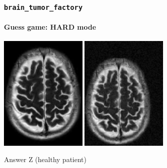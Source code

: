 \documentclass[]{beamer}
\newcommand{\btf}{\tt{brain\_tumor\_factory}}
\begin{document}
\begin{frame}
  \frametitle{\btf}
  \framesubtitle{Guess game: HARD mode}
  \begin{minipage}{\linewidth}
    \begin{center}
      \includegraphics[width=4.2cm]{resources/brain_base}
      \includegraphics[width=4.2cm]{resources/z3}
    \end{center}
  \end{minipage}
  \pause
  \begin{block}{Answer}
    Z (healthy patient)
  \end{block}
\end{frame}
\end{document}
